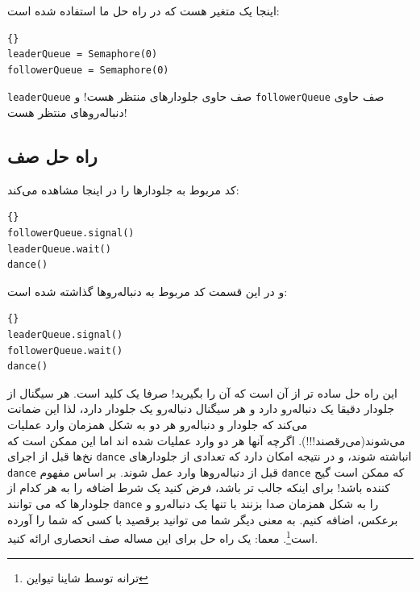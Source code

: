 \documentclass{book}
\newcommand{\clearemptydoublepage}{\newpage\cleardoublepage}
\begin{document}
اینجا یک متغیر
هست که در راه حل ما استفاده شده است:

\begin{latin}
\begin{latin}
\begin{lstlisting}[title={Queue hint}]{}
leaderQueue = Semaphore(0)
followerQueue = Semaphore(0)
\end{lstlisting}
\end{latin}
\end{latin}

{\tt leaderQueue} صف حاوی جلو‌دارهای منتظر هست!
و
 {\tt followerQueue} صف حاوی دنباله‌رو‌های منتظر هست!



\clearemptydoublepage
\subsection {راه حل صف}

کد مربوط به جلو‌دارها را در اینجا مشاهده می‌کند:

\begin{latin}
\begin{latin}
\begin{lstlisting}[title={Queue solution (leaders)}]{}
followerQueue.signal()
leaderQueue.wait()
dance()
\end{lstlisting}
\end{latin}
\end{latin}

و در این قسمت کد مربوط به دنباله‌روها گذاشته شده است:

\begin{latin}
\begin{latin}
\begin{lstlisting}[title={Queue solution (followers)}]{}
leaderQueue.signal()
followerQueue.wait()
dance()
\end{lstlisting}
\end{latin}
\end{latin}
این راه حل ساده تر از آن است که آن را بگیرید! صرفا یک کلید است. هر سیگنال از جلودار دقیقا یک دنباله‌رو دارد و هر سیگنال دنباله‌رو یک جلو‌دار دارد، لذا این ضمانت می‌کند که جلو‌دار و دنباله‌رو هر دو به شکل همزمان وارد عملیات می‌شوند(می‌رقصند!!!). اگرچه  آنها هر دو وارد عملیات شده اند اما این ممکن است که نخ‌ها قبل از اجرای {\tt dance} انباشته شوند، و در نتیجه امکان دارد که تعدادی از جلو‌دارهای {\tt dance} قبل از دنباله‌رو‌ها وارد عمل شوند. بر اساس مفهوم {\tt dance} که ممکن است گیج کننده باشد!
برای اینکه جالب تر باشد، فرض کنید یک شرط اضافه را به هر کدام از جلودار‌ها که می توانند {\tt dance} را به شکل همزمان صدا بزنند با تنها یک دنباله‌رو و برعکس، اضافه کنیم. به معنی دیگر شما می توانید برقصید با کسی که شما را آورده است\footnote{ترانه توسط شاینا تیواین}.
معما: یک راه حل برای این مساله صف انحصاری ارائه کنید.
\end{document}
